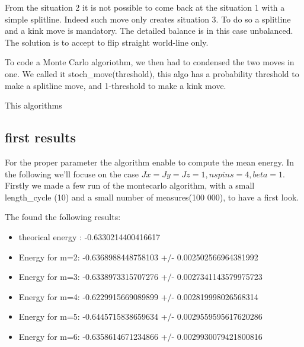 \documentclass[a4paper,12pt,twoside]{article}
\begin{document}
		 From the situation 2 it is not possible to come back at the situation 1 with a simple splitline. Indeed such move only creates situation 3. To do so a splitline and a kink move is mandatory. The detailed balance is in this case unbalanced.
		 The solution is to accept to flip straight world-line only.
		 
		 To code a Monte Carlo algoriothm, we then had to condensed the two moves in one. We called it stoch\_move(threshold), this algo has a probability threshold to make a splitline move, and 1-threshold to make a kink move.
		 
		 
		 
		 
		 This algorithms 
		 \subsection{first results}
		 For the proper parameter the algorithm enable to compute the mean energy. In the following we'll focuse on the case $Jx = Jy = Jz =1, nspins = 4, beta = 1$.
		 Firstly we made a few run of the montecarlo algorithm, with a small length\_cycle (10) and a small number of measures(100 000), to have a first look.
		 
		 The found the following results:
		 \begin{itemize}
		 	\item theorical energy : -0.6330214400416617
		 	\item Energy for m=2: -0.6368988448758103 +/- 0.002502566964381992
		 	\item Energy for m=3: -0.6338973315707276 +/- 0.0027341143579975723
		 	\item Energy for m=4: -0.6229915669089899 +/- 0.002819998026568314
		 	\item Energy for m=5: -0.6445715838659634 +/- 0.0029559595617620286
		 	\item Energy for m=6: -0.6358614671234866 +/- 0.0029930079421800816
		 \end{itemize}
		 
\end{document}
